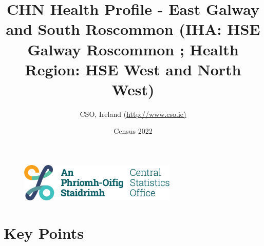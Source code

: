 \documentclass{article}
\title{CHN Health Profile - East Galway and South Roscommon (IHA: HSE Galway Roscommon ;  Health Region: HSE West and North West) }
\date{Census 2022}
\author{CSO, Ireland  (\url{http://www.cso.ie)}}
\begin{document}


\begin{figure}
	\centering
\includegraphics[width =75mm]{../figures/CSO_Logo.png}
\end{figure}

				 
		   
						  
														  
																																													
												 
			 
\maketitle
					
													   
				 
						 
																																																																											   
				 
				  
  \pagebreak
    	    \tableofcontents

\pagebreak


\section{Key Points}
\end{document}
